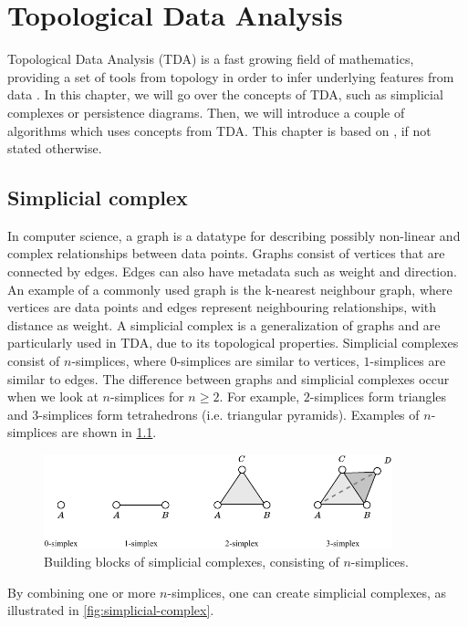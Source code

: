 \chapter{Topological Data Analysis}
Topological Data Analysis (TDA) is a fast growing field of mathematics, providing a set of tools from topology in order to infer underlying features from data \cite{chazal2021introduction}. In this chapter, we will go over the concepts of TDA, such as simplicial complexes or persistence diagrams. Then, we will introduce a couple of algorithms which uses concepts from TDA. This chapter is based on \cites{Edelsbrunner2010}{chazal2021introduction}, if not stated otherwise.

\section{Simplicial complex}
\label{sec:simplicial-complex}
In computer science, a graph is a datatype for describing possibly non-linear and complex relationships between data points. Graphs consist of vertices that are connected by edges. Edges can also have metadata such as weight and direction. An example of a commonly used graph is the k-nearest neighbour graph, where vertices are data points and edges represent neighbouring relationships, with distance as weight. A simplicial complex is a generalization of graphs and are particularly used in TDA, due to its topological properties. Simplicial complexes consist of $n$-simplices, where $0$-simplices are similar to vertices, $1$-simplices are similar to edges. The difference between graphs and simplicial complexes occur when we look at $n$-simplices for $n \geq 2$. For example, $2$-simplices form triangles and $3$-simplices form tetrahedrons (i.e. triangular pyramids). Examples of $n$-simplices are shown in \cref{fig:n-simplices-example}.
\begin{figure}[H]
    \centering
    \includegraphics[width=0.9\textwidth]{thesis/figures/n-simplices_cropped.pdf}
    \caption{Building blocks of simplicial complexes, consisting of $n$-simplices.}
    \label{fig:n-simplices-example}
\end{figure}
By combining one or more $n$-simplices, one can create simplicial complexes, as illustrated in \cref{fig:simplicial-complex}.
